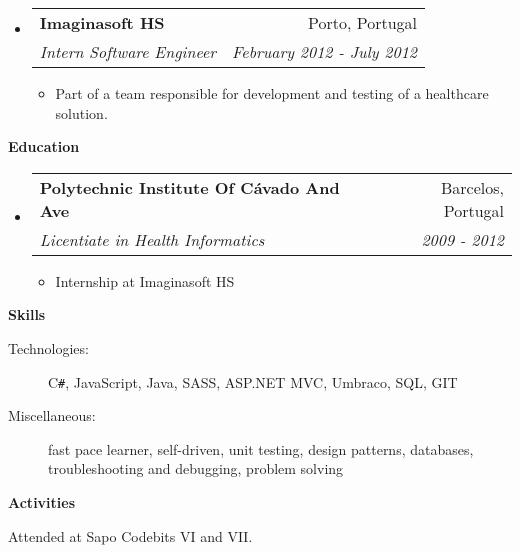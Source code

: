\documentclass[letterpaper,11pt]{article}
\makeatletter
\newcommand{\resitem}[1]{\item #1 \vspace{-2pt}}
\newcommand{\resheading}[1]{{\large \colorbox{mygrey}{\begin{minipage}{\textwidth}{\textbf{#1 \vphantom{p\^{E}}}}\end{minipage}}}}
\newcommand{\ressubheading}[4]{
	\begin{tabular*}{7.0in}{l@{\extracolsep{\fill}}r}
		\textbf{#1} & #2 \\
		\textit{#3} & \textit{#4} \\
	\end{tabular*}\vspace{-6pt}}
\makeatother
\begin{document}
\begin{itemize}
		\item
		\ressubheading{Imaginasoft HS}{Porto, Portugal}{Intern Software Engineer}{February 2012 - July 2012}
		\begin{itemize}
			\resitem{Part of a team responsible for development and testing of a healthcare solution.}
		\end{itemize}
	\end{itemize}

\resheading{Education}
	\begin{itemize}
		\item
		\ressubheading{Polytechnic Institute Of C\'avado And Ave}{Barcelos, Portugal}{Licentiate in Health Informatics}{2009 - 2012}
		\begin{itemize}
			\resitem{Internship at Imaginasoft HS}
		\end{itemize}
		
	\end{itemize}
	
	
	\resheading{Skills}
	
	\begin{description}
		\item[Technologies:]
		C{}\verb!#!, JavaScript, Java, SASS, ASP.NET MVC, Umbraco, SQL, GIT
		\item[Miscellaneous:]
		fast pace learner, self-driven, unit testing, design patterns, databases, troubleshooting and debugging, problem solving
	\end{description}	
	
	\resheading{Activities}
	
	\begin{description}
		\item[Attended at Sapo Codebits VI and VII.]
	\end{description}
	
\end{document}
